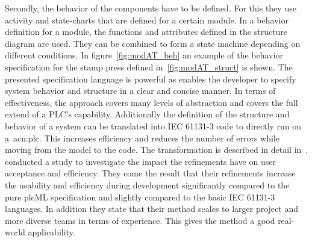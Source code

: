 Secondly, the behavior of the components have to be defined.
For this they use activity and state-charts that are defined for a certain module.
In a behavior definition for a module, the functions and attributes defined in the structure diagram are used.
They can be combined to form a state machine depending on different conditions.
In figure~\ref{fig:modAT_beh} an example of the behavior specification for the stamp press defined in~\ref{fig:modAT_struct} is shown.
The presented specification language is powerful as enables the developer to specify system behavior and structure in a clear and concise manner.
In terms of effectiveness, the approach covers many levels of abstraction and covers the full extend of a PLC's capability.
Additionally the definition of the structure and behavior of a system can be translated into IEC 61131-3 code to directly run on a~\acrshort{acn:plc}.
This increases efficiency and reduces the number of errors while moving from the model to the code.
The transformation is described in detail in~\cite{WITSCH2015}.
\citeauthor{Obermeier:2015aa} conducted a study to investigate the impact the refinements have on user acceptance and efficiency.
They come the result that their refinements increase the usability and efficiency during development significantly compared to the pure plcML specification and slightly compared to the basic IEC 61131-3 languages.
In addition they state that their method scales to larger project and more diverse teams in terms of experience.
This gives the method a good real-world applicability.

